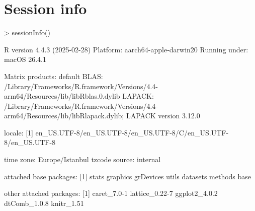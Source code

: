 \documentclass[10pt]{article}
\begin{document}
\section{Session info}
\begin{Schunk}
\begin{Sinput}
> sessionInfo()
\end{Sinput}
\begin{Soutput}
R version 4.4.3 (2025-02-28)
Platform: aarch64-apple-darwin20
Running under: macOS 26.4.1

Matrix products: default
BLAS:   /Library/Frameworks/R.framework/Versions/4.4-arm64/Resources/lib/libRblas.0.dylib 
LAPACK: /Library/Frameworks/R.framework/Versions/4.4-arm64/Resources/lib/libRlapack.dylib;  LAPACK version 3.12.0

locale:
[1] en_US.UTF-8/en_US.UTF-8/en_US.UTF-8/C/en_US.UTF-8/en_US.UTF-8

time zone: Europe/Istanbul
tzcode source: internal

attached base packages:
[1] stats     graphics  grDevices utils     datasets  methods   base     

other attached packages:
[1] caret_7.0-1    lattice_0.22-7 ggplot2_4.0.2  dtComb_1.0.8   knitr_1.51    


\end{Soutput}
\end{Schunk}
\end{document}

